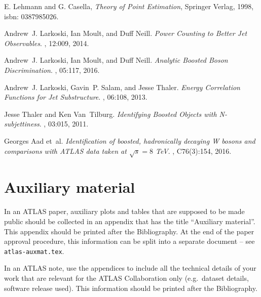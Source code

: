 \documentclass[UKenglish,texlive=2013]{\ATLASLATEXPATH atlasdoc}
\begin{document}
\begin{thebibliography}{9}
E. Lehmann and G. Casella,
\emph{Theory of Point Estimation},
Springer Verlag, 1998,
isbn: 0387985026.


Andrew~J. Larkoski, Ian Moult, and Duff Neill.
\emph {Power Counting to Better Jet Observables}.
, 12:009, 2014.

Andrew~J. Larkoski, Ian Moult, and Duff Neill.
\emph {Analytic Boosted Boson Discrimination}.
, 05:117, 2016.

Andrew~J. Larkoski, Gavin~P. Salam, and Jesse Thaler.
\emph {Energy Correlation Functions for Jet Substructure}.
, 06:108, 2013.

Jesse Thaler and Ken Van~Tilburg.
\emph {Identifying Boosted Objects with N-subjettiness}.
, 03:015, 2011.


Georges Aad et~al.
\emph {Identification of boosted, hadronically decaying W bosons and
  comparisons with ATLAS data taken at $\sqrt{s} = 8$ TeV}.
, C76(3):154, 2016.



\end{thebibliography}
\printbibliography
%
%

\clearpage
{}

\clearpage
\appendix
\part*{Auxiliary material}

In an ATLAS paper, auxiliary plots and tables that are supposed to be made public 
should be collected in an appendix that has the title \enquote{Auxiliary material}.
This appendix should be printed after the Bibliography.
At the end of the paper approval procedure, this information can be split into a separate document
-- see \texttt{atlas-auxmat.tex}.

In an ATLAS note, use the appendices to include all the technical details of your work
that are relevant for the ATLAS Collaboration only (e.g.\ dataset details, software release used).
This information should be printed after the Bibliography.
\end{document}
